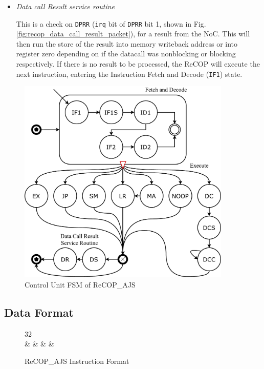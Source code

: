\documentclass[]{article}
\begin{document}
\begin{itemize}
		\item \emph{Data call Result service routine} \par 
		This is a check on \texttt{DPRR} (\texttt{irq} bit of \texttt{DPRR} bit 1, shown in Fig. \ref{fig:recop_data_call_result_packet}), for a result from the NoC. This will then run the store of the result into memory writeback address or into register zero depending on if the datacall was nonblocking or blocking respectively. If there is no result to be processed, the ReCOP will execute the next instruction, entering the Instruction Fetch and Decode (\texttt{IF1}) state.
		
	\end{itemize}
	
	\begin{figure}[H]
		\centering
		\includegraphics[width = 4in]{recop_control_fsm}
		\caption{Control Unit FSM of ReCOP\_AJS}
		\label{fig:recop_fsm}
	\end{figure}
	
	\newpage
	
	\subsection{Data Format}
	
	\begin{figure}[H]
		\centering
		\captionsetup{justification=centering,margin=2cm}
		\begin{bytefield}[endianness=big,boxformatting={\centering},
			bitwidth=1em,bitheight=8mm]{32}
			 \\
			 &
			 &
			 &     
			 & 
		\end{bytefield}
		\caption{ReCOP\_AJS Instruction Format}
		\label{fig:recop_instruction_packet}
	\end{figure}
	
\end{document}
